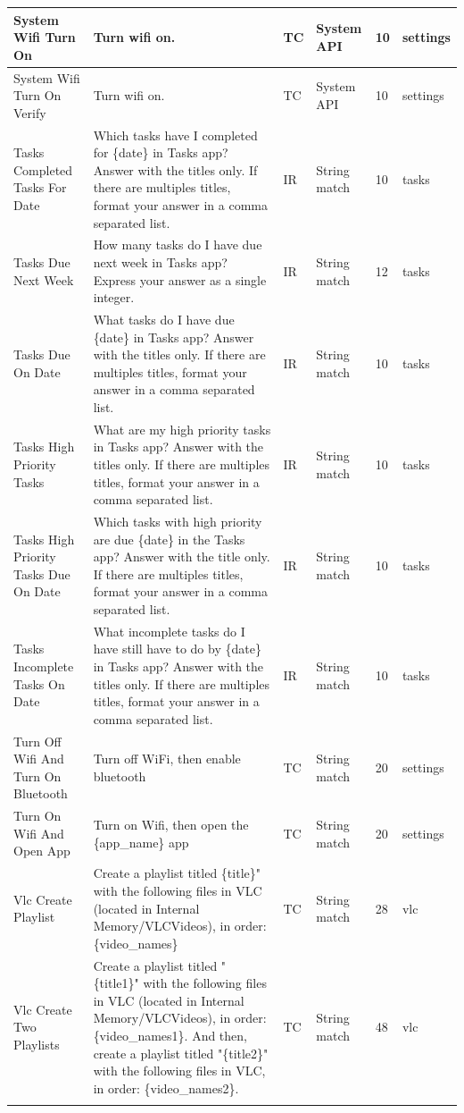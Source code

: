 \documentclass{article}
\begin{document}
\begin{appendices}
\begin{longtable}{>{\RaggedRight\seqsplit}p{.8in}p{2in}p{.3in}p{.5in}p{.3in}p{.5in}}
\midrule
System Wifi Turn On & Turn wifi on. & TC & System API & 10 & settings \\
\midrule
System Wifi Turn On Verify & Turn wifi on. & TC & System API & 10 & settings \\
\midrule
Tasks Completed Tasks For Date & Which tasks have I completed for \{date\} in Tasks app? Answer with the titles only. If there are multiples titles, format your answer in a comma separated list. & IR & String match & 10 & tasks \\
\midrule
Tasks Due Next Week & How many tasks do I have due next week in Tasks app? Express your answer as a single integer. & IR & String match & 12 & tasks \\
\midrule
Tasks Due On Date & What tasks do I have due \{date\} in Tasks app? Answer with the titles only. If there are multiples titles, format your answer in a comma separated list. & IR & String match & 10 & tasks \\
\midrule
Tasks High Priority Tasks & What are my high priority tasks in Tasks app? Answer with the titles only. If there are multiples titles, format your answer in a comma separated list. & IR & String match & 10 & tasks \\
\midrule
Tasks High Priority Tasks Due On Date & Which tasks with high priority are due \{date\} in the Tasks app? Answer with the title only. If there are multiples titles, format your answer in a comma separated list. & IR & String match & 10 & tasks \\
\midrule
Tasks Incomplete Tasks On Date & What incomplete tasks do I have still have to do by \{date\} in Tasks app? Answer with the titles only. If there are multiples titles, format your answer in a comma separated list. & IR & String match & 10 & tasks \\
\midrule
Turn Off Wifi And Turn On Bluetooth & Turn off WiFi, then enable bluetooth & TC & String match & 20 & settings \\
\midrule
Turn On Wifi And Open App & Turn on Wifi, then open the \{app\_name\} app & TC & String match & 20 & settings \\
\midrule
Vlc Create Playlist & Create a playlist titled \{title\}" with the following files in VLC (located in Internal Memory/VLCVideos), in order: \{video\_names\} & TC & String match & 28 & vlc \\
\midrule
Vlc Create Two Playlists & Create a playlist titled "\{title1\}" with the following files in VLC (located in Internal Memory/VLCVideos), in order: \{video\_names1\}. And then, create a playlist titled "\{title2\}" with the following files in VLC, in order: \{video\_names2\}. & TC & String match & 48 & vlc \\
\bottomrule
\label{tab:all-task-list}
\end{longtable}


\end{appendices}
\end{document}
